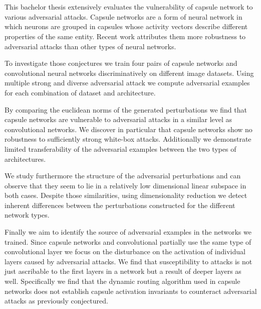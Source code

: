 \section*{}

This bachelor thesis extensively evaluates the vulnerability of capsule network to various adversarial attacks.
Capsule networks are a form of neural network in which neurons are grouped in capsules whose activity vectors describe different properties of the same entity.
Recent work attributes them more robustness to adversarial attacks than other types of neural networks.

To investigate those conjectures we train four pairs of capsule networks and convolutional neural networks discriminatively on different image datasets.
Using multiple strong and diverse adversarial attack we compute adversarial examples for each combination of dataset and architecture.

By comparing the euclidean norms of the generated perturbations we find that capsule networks are vulnerable to adversarial attacks in a similar level as convolutional networks.
We discover in particular that capsule networks show no robustness to sufficiently strong white-box attacks.
Additionally we demonstrate limited transferability of the adversarial examples between the two types of architectures.

We study furthermore the structure of the adversarial perturbations and can observe that they seem to lie in a relatively low dimensional linear subspace in both cases.
Despite those similarities, using dimensionality reduction we detect inherent differences between the perturbations constructed for the different network types.

Finally we aim to identify the source of adversarial examples in the networks we trained.
Since capsule networks and convolutional partially use the same type of convolutional layer we focus on the disturbance on the activation of individual layers caused by adversarial attacks.
We find that susceptibility to attacks is not just ascribable to the first layers in a network but a result of deeper layers as well.
Specifically we find that the dynamic routing algorithm used in capsule networks does not establish capsule activation invariants to counteract adversarial attacks as previously conjectured.